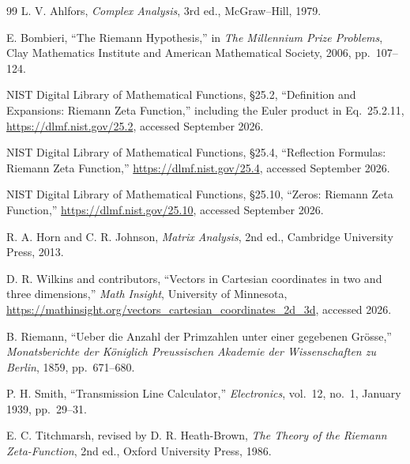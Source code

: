 \documentclass[11pt]{article}
\begin{document}
\begin{thebibliography}{99}
\small
{}
L. V. Ahlfors, \emph{Complex Analysis}, 3rd ed., McGraw--Hill, 1979.

E. Bombieri, ``The Riemann Hypothesis,'' in \emph{The Millennium Prize Problems},
Clay Mathematics Institute and American Mathematical Society, 2006, pp.~107--124.

NIST Digital Library of Mathematical Functions, \S25.2, ``Definition and Expansions:
Riemann Zeta Function,'' including the Euler product in Eq.~25.2.11,
\url{https://dlmf.nist.gov/25.2}, accessed September 2026.

NIST Digital Library of Mathematical Functions, \S25.4, ``Reflection Formulas:
Riemann Zeta Function,'' \url{https://dlmf.nist.gov/25.4}, accessed September 2026.

NIST Digital Library of Mathematical Functions, \S25.10, ``Zeros: Riemann Zeta Function,''
\url{https://dlmf.nist.gov/25.10}, accessed September 2026.

R. A. Horn and C. R. Johnson, \emph{Matrix Analysis}, 2nd ed.,
Cambridge University Press, 2013.

D. R. Wilkins and contributors, ``Vectors in Cartesian coordinates in two and three
dimensions,'' \emph{Math Insight}, University of Minnesota,
\url{https://mathinsight.org/vectors_cartesian_coordinates_2d_3d}, accessed 2026.

B. Riemann, ``Ueber die Anzahl der Primzahlen unter einer gegebenen Gr\"osse,''
\emph{Monatsberichte der K\"oniglich Preussischen Akademie der Wissenschaften zu Berlin},
1859, pp.~671--680.

P. H. Smith, ``Transmission Line Calculator,'' \emph{Electronics}, vol.~12, no.~1,
January 1939, pp.~29--31.

E. C. Titchmarsh, revised by D. R. Heath-Brown,
\emph{The Theory of the Riemann Zeta-Function}, 2nd ed., Oxford University Press, 1986.
\end{thebibliography}
\end{document}
